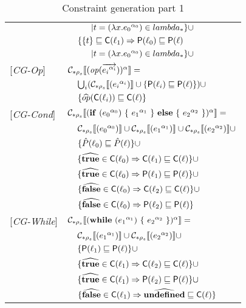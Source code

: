 \begin{table}
\begin{tabular}{l l l l}
&&&$| t = (\lambda x.{e_0}^{\alpha_0}) \in lambda_* \}\cup$\\
&& \multicolumn{2}{l}{$\{\{ t \} \sqsubseteq \mathsf{C}(\ell_1) \Rightarrow \mathsf{P}(\ell_0) \sqsubseteq \mathsf{P}(\ell)$}\\
&&&$| t = (\lambda x.{e_0}^{\alpha_0}) \in lambda_* \}\cup$\\
{[\textit{CG-Op}]}&\multicolumn{3}{l}{$ \mathcal{C}_{*\rho_s}\llbracket (\mathit{op} (\overrightarrow{{e_i}^{\alpha_i}}))^\alpha \rrbracket = $}\\
&&\multicolumn{2}{l}{$\bigcup_i (\mathcal{C}_{*\rho_s}\llbracket ({e_i}^{\alpha_i}) \rrbracket \cup \{ \mathsf{P}(\ell_i) \sqsubseteq \mathsf{P}(\ell) \})\cup$}\\
&&\multicolumn{2}{l}{$\{ \widehat{op} (\mathsf{C}(\ell_i)) \sqsubseteq \mathsf{C}(\ell) \}$}\\
{[\textit{CG-Cond}]}&\multicolumn{3}{l}{$\mathcal{C}_{*\rho_s}\llbracket (\mathbf{if}\ ({e_0}^{\alpha_0})\ \{\ {e_1}^{\alpha_1}\ \}\ \mathbf{else}\ \{\ {e_2}^{\alpha_2}\ \})^\alpha \rrbracket = $}\\
&&\multicolumn{2}{l}{$ \mathcal{C}_{*\rho_s}\llbracket ({e_0}^{\alpha_0}) \rrbracket \cup \mathcal{C}_{*\rho_s}\llbracket ({e_1}^{\alpha_1}) \rrbracket \cup \mathcal{C}_{*\rho_s}\llbracket ({e_2}^{\alpha_2}) \rrbracket \cup$}\\
&&\multicolumn{2}{l}{$\{ \hat{P}(\ell_0) \sqsubseteq \hat{P}(\ell) \} \cup$} \\
&&\multicolumn{2}{l}{$\{ \widehat{\mathbf{true}} \in \mathsf{C}(\ell_0) \Rightarrow \mathsf{C}(\ell_1) \sqsubseteq \mathsf{C}(\ell) \}\cup$}\\
&&\multicolumn{2}{l}{$\{ \widehat{\mathbf{true}} \in \mathsf{C}(\ell_0) \Rightarrow \mathsf{P}(\ell_1) \sqsubseteq \mathsf{P}(\ell) \}\cup$} \\
&&\multicolumn{2}{l}{$\{ \widehat{\mathbf{false}} \in \mathsf{C}(\ell_0) \Rightarrow \mathsf{C}(\ell_2) \sqsubseteq \mathsf{C}(\ell) \}\cup$}\\
&&\multicolumn{2}{l}{$\{ \widehat{\mathbf{false}} \in \mathsf{C}(\ell_0) \Rightarrow \mathsf{P}(\ell_2) \sqsubseteq \mathsf{P}(\ell) \}$} \\
{[\textit{CG-While}]}&\multicolumn{3}{l}{$\mathcal{C}_{*\rho_s}\llbracket (\mathbf{while}\ ({e_1}^{\alpha_1})\ \{\ {e_2}^{\alpha_2}\ \})^\alpha \rrbracket = $}\\
&&\multicolumn{2}{l}{$ \mathcal{C}_{*\rho_s}\llbracket ({e_1}^{\alpha_1}) \rrbracket \cup \mathcal{C}_{*\rho_s}\llbracket ({e_2}^{\alpha_2}) \rrbracket \cup $}\\
&&\multicolumn{2}{l}{$\{ \mathsf{P}(\ell_1) \sqsubseteq \mathsf{P}(\ell) \} \cup$} \\
&&\multicolumn{2}{l}{$\{ \widehat{\mathbf{true}} \in \mathsf{C}(\ell_1) \Rightarrow \mathsf{C}(\ell_2) \sqsubseteq \mathsf{C}(\ell)  \}\cup$}\\
&&\multicolumn{2}{l}{$\{ \widehat{\mathbf{true}} \in \mathsf{C}(\ell_1) \Rightarrow \mathsf{P}(\ell_2) \sqsubseteq \mathsf{P}(\ell)  \}\cup$}\\
&&\multicolumn{2}{l}{$\{ \widehat{\mathbf{false}} \in \mathsf{C}(\ell_1) \Rightarrow \widehat{\mathbf{undefined}} \sqsubseteq \mathsf{C}(\ell) \}$}\\
\end{tabular}
\caption{Constraint generation part 1}
\label{tab:ConstGen1}
\end{table}
